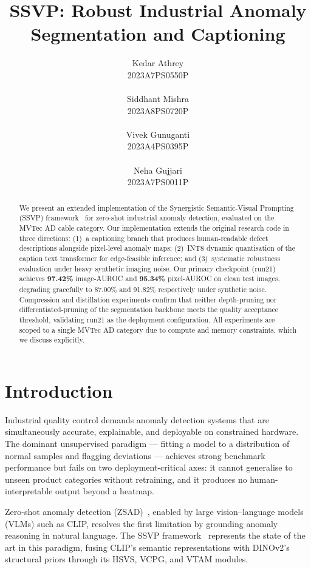 \documentclass[11pt]{article}
\title{SSVP: Robust Industrial Anomaly Segmentation and Captioning}
\author{Kedar Athrey \\
  2023A7PS0550P \\
  \\\And
  Siddhant Mishra \\
  2023A8PS0720P \\
    \\\And
  Vivek Gunuganti \\
  2023A4PS0395P \\
    \\\And
  Neha Gujjari \\
  2023A7PS0011P \\
}
\begin{document}
\maketitle

\begin{abstract}
We present an extended implementation of the Synergistic Semantic-Visual Prompting
(SSVP) framework~\cite{fu2026ssvp} for zero-shot industrial anomaly detection,
evaluated on the MVTec AD cable category. Our implementation extends the original
research code in three directions: (1)~a captioning branch
that produces human-readable defect descriptions alongside pixel-level anomaly
maps; (2)~INT8 dynamic quantisation of the caption text transformer for edge-feasible
inference; and (3)~systematic robustness evaluation under heavy synthetic imaging
noise. Our primary checkpoint (run21) achieves \textbf{97.42\%} image-AUROC and
\textbf{95.34\%} pixel-AUROC on clean test images, degrading gracefully to 87.00\%
and 91.82\% respectively under synthetic noise. Compression and distillation
experiments confirm that neither depth-pruning nor differentiated-pruning of the
segmentation backbone meets the quality acceptance threshold, validating run21 as
the deployment configuration. All experiments are scoped to a single MVTec AD
category due to compute and memory constraints, which we discuss explicitly.
\end{abstract}

\section{Introduction}

Industrial quality control demands anomaly detection systems that are simultaneously
accurate, explainable, and deployable on constrained hardware. The dominant
unsupervised paradigm — fitting a model to a distribution of normal samples and
flagging deviations — achieves strong benchmark performance but fails on two
deployment-critical axes: it cannot generalise to unseen product categories without
retraining, and it produces no human-interpretable output beyond a heatmap.

Zero-shot anomaly detection (ZSAD)~\cite{hicsonmez2024zsiad}, enabled by large
vision--language models (VLMs) such as CLIP, resolves the
first limitation by grounding anomaly reasoning in natural language. The SSVP
framework~\cite{fu2026ssvp} represents the state of the art in this paradigm,
fusing CLIP's semantic representations with DINOv2's structural priors through its
HSVS, VCPG, and VTAM modules.
\end{document}
